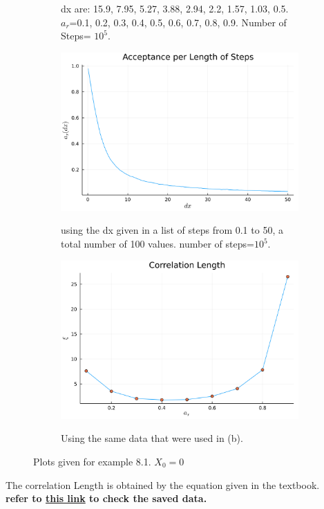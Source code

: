 \documentclass[12pt]{article}
\begin{document}
\begin{figure}[H]
\begin{subfigure}[t]{0.48\textwidth}
		\label{fig:mesh3.2}
		\caption{dx are: 15.9, 7.95, 5.27, 3.88, 2.94, 2.2, 1.57, 1.03, 0.5. $a_{r}$=0.1, 0.2, 0.3, 0.4, 0.5, 0.6, 0.7, 0.8, 0.9. Number of Steps= $10^{5}$. }
	\end{subfigure}\hfill
	\begin{subfigure}[t]{0.48\textwidth}
		\includegraphics[width=\textwidth]{acceptance_ratio.png}
		\label{fig:mesh3.3}
		\caption{using the dx given in a list of steps from 0.1 to 50, a total number of 100 values. number of steps=$10^{5}$.}
	\end{subfigure}\hfill
	\begin{subfigure}[t]{0.48\textwidth}
		\includegraphics[width=\textwidth]{correlationLength.png}
		\label{fig:mesh3.4}
		\caption{Using the same data that were used in (b).}
	\end{subfigure}\hfill
	\label{fig:mesh3}
	\caption{Plots given for example 8.1. $X_{0}= 0$}
\end{figure}
The correlation Length is obtained by the equation given in the textbook.\\
    \textbf{refer to  \href{https://github.com/narges8k/computational_physics/tree/main/chapter6}{this link} to check the saved data.}
\end{document}
